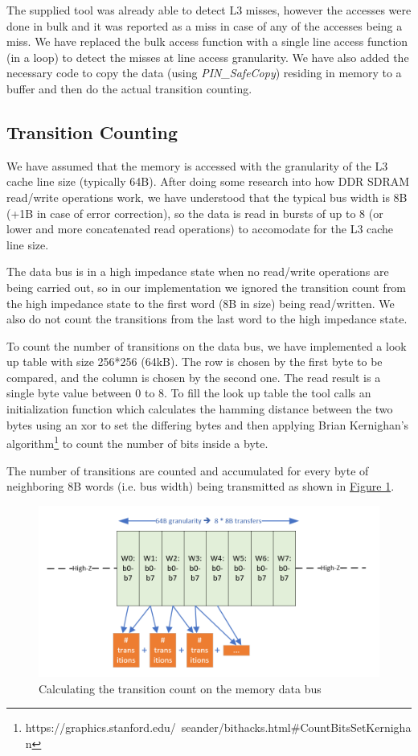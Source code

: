 \documentclass[a4paper,12pt]{article}
\begin{document}
The supplied tool was already able to detect L3 misses, however the accesses were done in bulk and it was reported as a miss in case of any of the accesses being a miss. We have replaced the bulk access function with a single line access function (in a loop) to detect the misses at line access granularity. We have also added the necessary code to copy the data (using \emph{PIN\_SafeCopy}) residing in memory to a buffer and then do the actual transition counting.

\subsection{Transition Counting}
We have assumed that the memory is accessed with the granularity of the L3 cache line size (typically 64B). After doing some research into how DDR SDRAM read/write operations work, we have understood that the typical bus width is 8B (+1B in case of error correction), so the data is read in bursts of up to 8 (or lower and more concatenated read operations) to accomodate for the L3 cache line size.

The data bus is in a high impedance state when no read/write operations are being carried out, so in our implementation we ignored the transition count from the high impedance state to the first word (8B in size) being read/written. We also do not count the transitions from the last word to the high impedance state.

To count the number of transitions on the data bus, we have implemented a look up table with size 256*256 (64kB). The row is chosen by the first byte to be compared, and the column is chosen by the second one. The read result is a single byte value between 0 to 8. To fill the look up table the tool calls an initialization function which calculates the hamming distance between the two bytes using an xor to set the differing bytes and then applying Brian Kernighan's algorithm\footnote{https://graphics.stanford.edu/~seander/bithacks.html\#CountBitsSetKernighan} to count the number of bits inside a byte. 

The number of transitions are counted and accumulated for every byte of neighboring 8B words (i.e. bus width) being transmitted as shown in \hyperref[fig_1]{Figure 1}. 

\begin{figure}[h]
		\label{fig_1}
		\centering
		\includegraphics[scale=0.5]{databus_1.png}
		\caption{Calculating the transition count on the memory data bus}
\end{figure}
\end{document}
